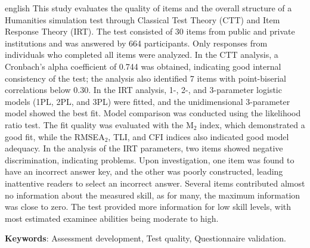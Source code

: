 \begin{resumo}[Abstract]
 \begin{otherlanguage*}{english}
   This study evaluates the quality of items and the overall structure of a Humanities simulation test through Classical Test Theory (CTT) and Item Response Theory (IRT). The test consisted of 30 items from public and private institutions and was answered by 664 participants. Only responses from individuals who completed all items were analyzed. In the CTT analysis, a Cronbach's alpha coefficient of 0.744 was obtained, indicating good internal consistency of the test; the analysis also identified 7 items with point-biserial correlations below 0.30. In the IRT analysis, 1-, 2-, and 3-parameter logistic models (1PL, 2PL, and 3PL) were fitted, and the unidimensional 3-parameter model showed the best fit. Model comparison was conducted using the likelihood ratio test. The fit quality was evaluated with the M$_2$ index, which demonstrated a good fit, while the RMSEA$_2$, TLI, and CFI indices also indicated good model adequacy. In the analysis of the IRT parameters, two items showed negative discrimination, indicating problems. Upon investigation, one item was found to have an incorrect answer key, and the other was poorly constructed, leading inattentive readers to select an incorrect answer. Several items contributed almost no information about the measured skill, as for many, the maximum information was close to zero. The test provided more information for low skill levels, with most estimated examinee abilities being moderate to high.


   \noindent
   \textbf{Keywords}: Assessment development, Test quality, Questionnaire validation.
 \end{otherlanguage*}
\end{resumo}